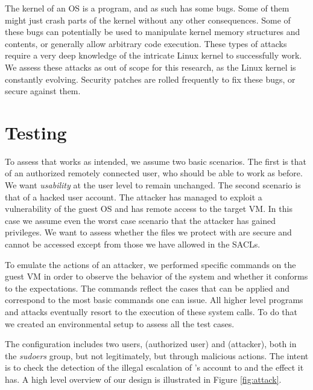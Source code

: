 \par The kernel of an \ac{OS} is a program, and as such has some bugs. Some of them might just crash parts of the kernel without any other consequences. Some of these bugs can potentially be used to manipulate kernel memory structures and contents, or generally allow arbitrary code execution. These types of attacks require a very deep knowledge of the intricate Linux kernel to successfully work. We assess these attacks as out of scope for this research, as the Linux kernel is constantly evolving. Security patches are rolled frequently to fix these bugs, or secure against them.

\section{Testing}\label{sec:testing}

\par To assess that  works as intended, we assume two basic scenarios. The first is that of an authorized remotely connected user, who should be able to work as before. We want \emph{usability} at the user level to remain unchanged. The second scenario is that of a hacked user account. The attacker has managed to exploit a vulnerability of the guest \ac{OS} and has remote access to the target \ac{VM}. In this case we assume even the worst case scenario that the attacker has gained  privileges. We want to assess whether the files we protect with  are secure and cannot be accessed except from those we have allowed in the \acp{SACL}.

\par To emulate the actions of an attacker, we performed specific commands on the guest \ac{VM} in order to observe the behavior of the system and whether it conforms to the expectations. The commands reflect the cases that  can be applied and correspond to the most basic commands one can issue. All higher level programs and attacks eventually resort to the execution of these system calls. To do that we created an environmental setup to assess all the test cases. 

\par The configuration includes two users,  (authorized user) and  (attacker), both in the \emph{sudoers} group, but  not legitimately, but through malicious actions. The intent is to check the detection of the illegal escalation of 's account to  and the effect it has. A high level overview of our design is illustrated in Figure \ref{fig:attack}. 

